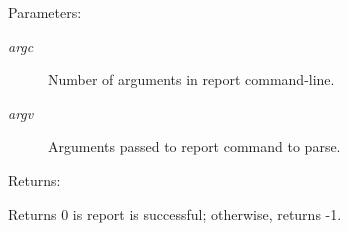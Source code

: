 \begin{Desc}
\item[Parameters: ]\par
\begin{description}
\item[{\em 
argc}]Number of arguments in report command-line. \item[{\em 
argv}]Arguments passed to report command to parse. \end{description}
\end{Desc}
\begin{Desc}
\item[Returns: ]\par
Returns 0 is report is successful; otherwise, returns -1. \end{Desc}
